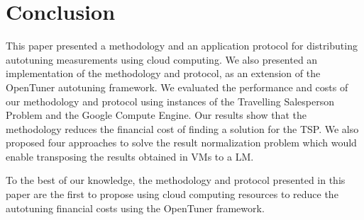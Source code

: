 \section{Conclusion} \label{sec:conclusion}

This paper presented a methodology and an application protocol for distributing
autotuning measurements using cloud computing. We also presented an
implementation of the methodology and protocol, as an extension of the
OpenTuner autotuning framework.  We evaluated the performance and costs of our
methodology and protocol using instances of the Travelling Salesperson Problem
and the Google Compute Engine.
Our results show that the methodology reduces the financial cost of finding a solution
for the TSP.
We also proposed four approaches to solve the result normalization problem which
would enable transposing the results obtained in VMs to a LM.

To the best of our knowledge, the methodology and protocol presented in this
paper are the first to propose using cloud computing resources to
reduce the
autotuning financial costs using the OpenTuner framework.
